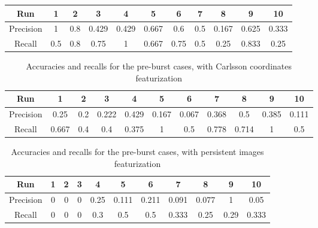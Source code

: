 \documentclass{article}
\begin{document}
\begin{appendix}
\begin{table}[h!]
\begin{tabular}{c|c|c|c|c|c|c|c|c|c|c}
Run&1&2&3&4&5&6&7&8&9&10\\
\hline\hline
Precision&1&0.8&0.429&0.429&0.667&0.6&0.5&0.167&0.625&0.333\\
\hline
Recall&0.5&0.8&0.75&1&0.667&0.75&0.5&0.25&0.833&0.25\\

\end{tabular}
\end{table} 

\begin{table}[h!]
\caption{Accuracies and recalls for the pre-burst cases, with Carlsson coordinates featurization}                 %
\label{recalls_accuracies_templatefunctions}    %
\centering                        %
\begin{tabular}{c|c|c|c|c|c|c|c|c|c|c}

Run&1&2&3&4&5&6&7&8&9&10\\
\hline\hline
Precision&0.25&0.2&0.222&0.429&0.167&0.067&0.368&0.5&0.385&0.111\\
\hline
Recall&0.667&0.4&0.4&0.375&1&0.5&0.778&0.714&1&0.5\\

\end{tabular}
\end{table}

\begin{table}[h!]
\caption{Accuracies and recalls for the pre-burst cases, with persistent images featurization}                 %
\label{recalls_accuracies_templatefunctions}    %
\centering                        %
\begin{tabular}{c|c|c|c|c|c|c|c|c|c|c}

Run&1&2&3&4&5&6&7&8&9&10\\
\hline\hline
Precision&0&0&0&0.25&0.111&0.211&0.091&0.077&1&0.05\\
\hline
Recall&0&0&0&0.3&0.5&0.5&0.333&0.25&0.29&0.333\\

\end{tabular}
\end{table}

\end{appendix}
\end{document}
